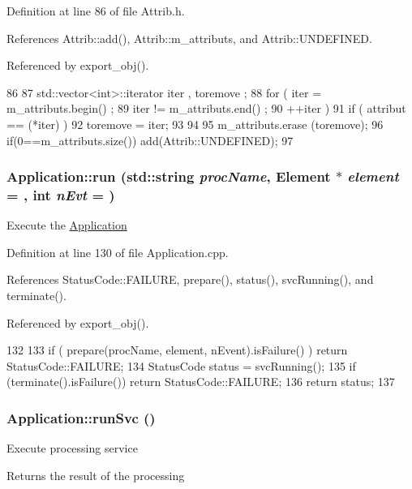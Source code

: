 Definition at line 86 of file Attrib.h.

References Attrib::add(), Attrib::m\_\-attributs, and Attrib::UNDEFINED.

Referenced by export\_\-obj().


\begin{DoxyCode}
86                                {
87     std::vector<int>::iterator iter , toremove ;
88     for ( iter  = m_attributs.begin() ;
89           iter != m_attributs.end()   ;
90           ++iter ) {
91       if ( attribut == (*iter) ) {
92         toremove = iter;
93       }
94     }
95     m_attributs.erase (toremove);
96     if(0==m_attributs.size()) add(Attrib::UNDEFINED);
97   }
\end{DoxyCode}
\hypertarget{classApplication_a7fdd5bfee44e49896292f8964037384d}{
\subsubsection[{run}]{ Application::run (std::string {\em procName}, \/  {\bf Element} $\ast$ {\em element} = {}, \/  int {\em nEvt} = {})}}
\label{classApplication_a7fdd5bfee44e49896292f8964037384d}
Execute the \hyperlink{classApplication}{Application} 

Definition at line 130 of file Application.cpp.

References StatusCode::FAILURE, prepare(), status(), svcRunning(), and terminate().

Referenced by export\_\-obj().


\begin{DoxyCode}
132                                            {
133   if ( prepare(procName, element, nEvent).isFailure() ) return 
      StatusCode::FAILURE;
134   StatusCode status = svcRunning();
135   if (terminate().isFailure()) return StatusCode::FAILURE;
136   return status;
137 }
\end{DoxyCode}
\hypertarget{classApplication_abfbf40397efe6ff0627d2ce1a55381ce}{
\subsubsection[{runSvc}]{ Application::runSvc ()}}
\label{classApplication_abfbf40397efe6ff0627d2ce1a55381ce}
Execute processing service \begin{DoxyReturn}{Returns}
the result of the processing 
\end{DoxyReturn}


